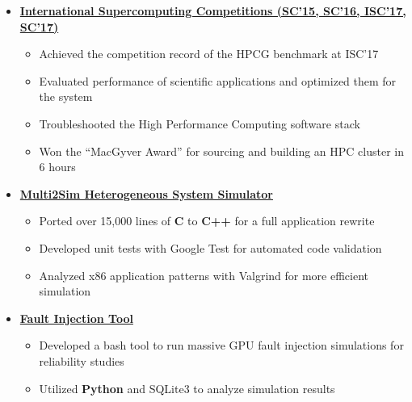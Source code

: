 \documentclass[11pt,letterpaper,sans]{moderncv}
\begin{document}
\begin{itemize}
{\begin{itemize}
	\item \textbf{\href{studentclustercompetition.us}{International Supercomputing Competitions (SC'15, SC'16, ISC'17, SC'17)}}
		\begin{itemize}
		\item Achieved the competition record of the HPCG benchmark at ISC'17
		\item Evaluated performance of scientific applications and optimized them for the system
		\item Troubleshooted the High Performance Computing software stack
		\item Won the ``MacGyver Award'' for sourcing and building an HPC cluster in 6 hours
		\end{itemize}
	\vspace{3pt}	
	\item \textbf{\href{http://multi2sim.org}{Multi2Sim Heterogeneous System Simulator}}
		\begin{itemize}
		\item Ported over 15,000 lines of \textbf{C} to \textbf{C++} for a full application rewrite
		\item Developed unit tests with Google Test for automated code validation
		\item Analyzed x86 application patterns with Valgrind for more efficient simulation
		\end{itemize}
	\vspace{3pt}	

	\item \textbf{\href{https://github.com/spencerhance/multi2sim-FaultInjectionTool}{Fault Injection Tool}}
		\begin{itemize}
		\item Developed a bash tool to run massive GPU fault injection simulations for reliability studies
		\item Utilized \textbf{Python} and SQLite3 to analyze simulation results
		\end{itemize}
		
\end{itemize}		
}
\vspace{6pt}



\end{itemize}
\end{document}
